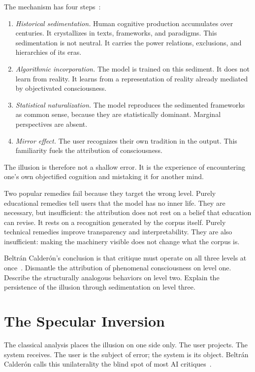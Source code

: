 \documentclass[sigconf]{acmart}
\begin{document}
The mechanism has four steps~\cite{BeltranCalderon:2026}:

\begin{enumerate}
\item \emph{Historical sedimentation.} Human cognitive production accumulates over centuries. It crystallizes in texts, frameworks, and paradigms. This sedimentation is not neutral. It carries the power relations, exclusions, and hierarchies of its eras.
\item \emph{Algorithmic incorporation.} The model is trained on this sediment. It does not learn from reality. It learns from a representation of reality already mediated by objectivated consciousness.
\item \emph{Statistical naturalization.} The model reproduces the sedimented frameworks as common sense, because they are statistically dominant. Marginal perspectives are absent.
\item \emph{Mirror effect.} The user recognizes their own tradition in the output. This familiarity fuels the attribution of consciousness.
\end{enumerate}

The illusion is therefore not a shallow error. It is the experience of encountering one's own objectified cognition and mistaking it for another mind.

Two popular remedies fail because they target the wrong level. Purely educational remedies tell users that the model has no inner life. They are necessary, but insufficient: the attribution does not rest on a belief that education can revise. It rests on a recognition generated by the corpus itself. Purely technical remedies improve transparency and interpretability. They are also insufficient: making the machinery visible does not change what the corpus is.

Beltr\'an Calder\'on's conclusion is that critique must operate on all three levels at once~\cite{BeltranCalderon:2026}. Dismantle the attribution of phenomenal consciousness on level one. Describe the structurally analogous behaviors on level two. Explain the persistence of the illusion through sedimentation on level three.

\section{The Specular Inversion}
\label{sec:specular}

The classical analysis places the illusion on one side only. The user projects. The system receives. The user is the subject of error; the system is its object. Beltr\'an Calder\'on calls this unilaterality the blind spot of most AI critiques~\cite{BeltranCalderon:2026}.
\end{document}

